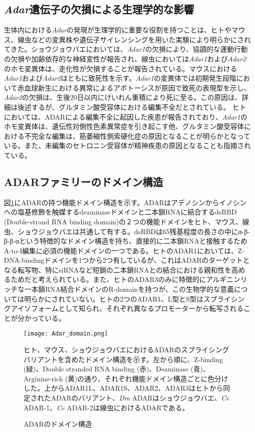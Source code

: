 \subsection{\textit{Adar}遺伝子の欠損による生理学的な影響}
生体内における\textit{Adar}の発現が生理学的に重要な役割を持つことは、ヒトやマウス、線虫などの変異株や遺伝子サイレンシングを用いた実験により明らかにされてきた。ショウジョウバエにおいては、\textit{Adar1}の欠損により、協調的な運動行動の欠損や加齢依存的な神経変性が報告され、線虫においては\textit{Adar1}および\textit{Adar2}のホモ変異体は、走化性が欠損することが報告されている。マウスにおける\textit{Adar1}および\textit{Adar2}はともに致死性を示す。\textit{Adar1}の変異体では初期発生段階において赤血球新生における異常によるアポトーシスが原因で致死の表現型を示し、\textit{Adar2}の欠損は、生後20日以内にけいれん重積により死に至る。この原因は、詳細は後述するが、グルタミン酸受容体における編集不全だとされている。
ヒトにおいては、ADARによる編集不全に起因した疾患が報告されており、\textit{Adar1}のホモ変異体は、遺伝性対側性色素異常症を引き起こす他、グルタミン酸受容体における不完全な編集は、筋萎縮性側索硬化症の原因となることが明らかとなっている。また、未編集のセトロニン受容体が精神疾患の原因となることも指摘されている。

\subsection{ADARファミリーのドメイン構造}
図\ref{fig:adar_domain}にADARの持つ機能ドメイン構造を示す。ADARはアデノシンからイノシンへの塩基修飾を触媒するdeaminaseドメインと二本鎖RNAに結合するdsRBD (Double-strand RNA binding domain)の２つの機能ドメインをヒト、マウス、線虫、ショウジョウバエは共通して有する。dsRBDは65残基程度の長さの中にα-β-β-β-αという特徴的なドメイン構造を持ち、直接的に二本鎖RNAと接触するためA-to-I編集に必須の機能ドメインの一つである。ヒトのADAR1においては、Z-DNA-bindingドメインを1つから2つ有しているが、これはADARのターゲットとなる転写物、特にsiRNAなど短鎖の二本鎖RNAとの結合における親和性を高めるためだと考えられている。また、ヒトのADAR3のみに特徴的にアルギニンリッチな一本鎖RNA結合ドメインのR-domainを持つが、この生物学的な意義については明らかにされていない。ヒトの2つのADAR1、L型とS型はスプライシングアイソフォームとして知られ、それぞれ異なるプロモーターから転写されることが分かっている。

\begin{figure}[!htbp]
	\begin{center}
		\texttt{[image: Adar\_domain.png]}
	\end{center}
	\caption{ADARのドメイン構造}
	\begin{flushleft}
		\small{ヒト、マウス、ショウジョウバエにおけるADARのスプライシングバリアントを含めたドメイン構造を示す。左から順に、Z-binding (緑)、Double stranded RNA binding (赤)、Deaminase (青)、Arginine-rich (黄)の通り、それぞれ機能ドメイン構造ごとに色分けした。上からADAR1L、ADAR1S、ADAR2、ADAR3はヒトから同定されたADARのバリアント、\textit{Dm} ADARはショウジョウバエ、\textit{Ce} ADAR-1、\textit{Ce} ADAR-2は線虫におけるADARである。}
	\end{flushleft}
	\label{fig:adar_domain}
\end{figure}

